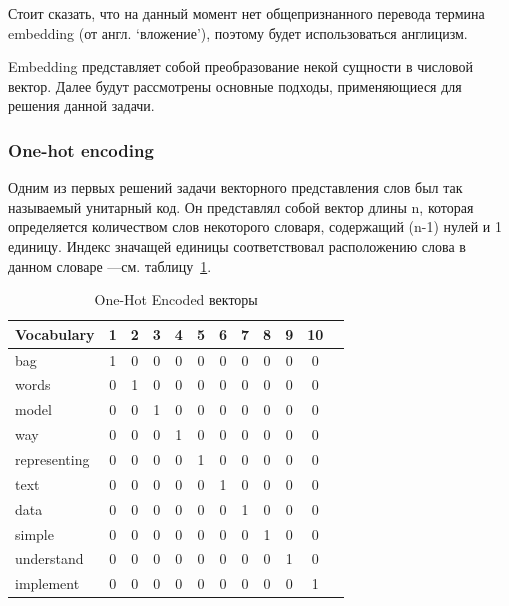 Стоит сказать, что на данный момент нет общепризнанного перевода термина embedding (от англ. ‘вложение’), поэтому будет использоваться англицизм. 

Embedding представляет собой преобразование некой сущности в числовой вектор. Далее будут рассмотрены основные подходы, применяющиеся для решения данной задачи.

\subsubsection{One-hot encoding}

Одним из первых решений задачи векторного представления слов был так называемый унитарный код. Он представлял собой вектор длины n, которая определяется количеством слов некоторого словаря, содержащий (n-1) нулей и 1 единицу. Индекс значащей единицы соответствовал расположению слова в данном словаре ---см. таблицу~\ref{tab:bow-ohe}.

\begin{table}
\centering
\caption{\label{tab:bow-ohe}One-Hot Encoded векторы}
\begin{tabular}{@{}lccccccccccc@{}}
\toprule
Vocabulary   & 1 & 2 & 3 & 4 & 5 & 6 & 7 & 8 & 9 & 10 \\ \midrule
bag          & 1 & 0 & 0 & 0 & 0 & 0 & 0 & 0 & 0 & 0  \\
words        & 0 & 1 & 0 & 0 & 0 & 0 & 0 & 0 & 0 & 0  \\
model        & 0 & 0 & 1 & 0 & 0 & 0 & 0 & 0 & 0 & 0  \\
way          & 0 & 0 & 0 & 1 & 0 & 0 & 0 & 0 & 0 & 0  \\
representing & 0 & 0 & 0 & 0 & 1 & 0 & 0 & 0 & 0 & 0  \\
text         & 0 & 0 & 0 & 0 & 0 & 1 & 0 & 0 & 0 & 0  \\
data         & 0 & 0 & 0 & 0 & 0 & 0 & 1 & 0 & 0 & 0  \\
simple       & 0 & 0 & 0 & 0 & 0 & 0 & 0 & 1 & 0 & 0  \\
understand   & 0 & 0 & 0 & 0 & 0 & 0 & 0 & 0 & 1 & 0  \\
implement    & 0 & 0 & 0 & 0 & 0 & 0 & 0 & 0 & 0 & 1  \\ \bottomrule
\end{tabular}
\end{table}

